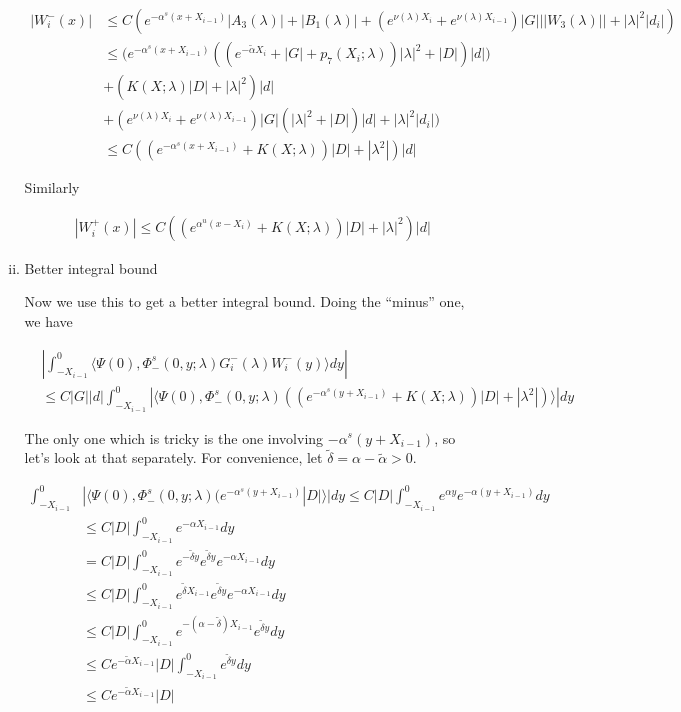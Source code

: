\documentclass[12pt]{article}
\begin{document}
\begin{enumerate}
\begin{enumerate}[(i)]
\begin{align*}
| W_i^-(x)| &\leq C \left( e^{-\alpha^s(x + X_{i-1})} |A_3(\lambda)| + |B_1(\lambda)| + (e^{\nu(\lambda)X_i} + e^{\nu(\lambda)X_{i-1}} )|G| ||W_3(\lambda)|| + |\lambda|^2 |d_i|  \right) \\
&\leq \Big( e^{-\alpha^s(x + X_{i-1})}( (e^{-\tilde{\alpha} X_i} + |G| + p_7(X_i; \lambda) ) |\lambda|^2  + |D|)|d|) \\
&+ ( K(X; \lambda) |D|+ |\lambda|^2 )|d| \\
&+ (e^{\nu(\lambda)X_i} + e^{\nu(\lambda)X_{i-1}} )|G| ( |\lambda|^2 + |D|)|d| + |\lambda|^2 |d_i| \Big) \\
&\leq C( (e^{-\alpha^s(x + X_{i-1})} + K(X; \lambda))|D| + |\lambda^2|)|d|
\end{align*}

Similarly

\begin{align*}
| W_i^+(x)| \leq C ( (e^{\alpha^u(x - X_i)} + K(X; \lambda))|D| + |\lambda|^2 )|d|
\end{align*}

\item Better integral bound

Now we use this to get a better integral bound. Doing the ``minus'' one, we have

\begin{align*}
&\left| \int_{-X_{i-1}}^0 \langle \Psi(0), \Phi^s_-(0, y; \lambda) G_i^-(\lambda)W_i^-(y) \rangle dy \right| \\
&\leq C |G| |d| \int_{-X_{i-1}}^0 | \langle \Psi(0), \Phi^s_-(0, y; \lambda) ( (e^{-\alpha^s(y + X_{i-1})} + K(X; \lambda))|D| + |\lambda^2|) \rangle | dy
\end{align*}

The only one which is tricky is the one involving ${-\alpha^s(y + X_{i-1})}$, so let's look at that separately. For convenience, let $\tilde{\delta} = \alpha - \tilde{\alpha} > 0$.

\begin{align*}
\int_{-X_{i-1}}^0 &| \langle \Psi(0), \Phi^s_-(0, y; \lambda) (e^{-\alpha^s(y + X_{i-1})} |D| \rangle | dy \leq C |D| \int_{-X_{i-1}}^0 e^{\alpha y} e^{-\alpha(y + X_{i-1})} dy \\
&\leq C |D| \int_{-X_{i-1}}^0 e^{-\alpha X_{i-1}} dy \\
&= C |D| \int_{-X_{i-1}}^0 e^{-\tilde{\delta} y} e^{\tilde{\delta} y}  e^{-\alpha X_{i-1}} dy \\
&\leq C |D| \int_{-X_{i-1}}^0 e^{\tilde{\delta} X_{i-1}} e^{\tilde{\delta} y}  e^{-\alpha X_{i-1}} dy \\
&\leq C |D| \int_{-X_{i-1}}^0 e^{-(\alpha - \tilde{\delta}) X_{i-1}} e^{\tilde{\delta} y} dy \\
&\leq C e^{-\tilde{\alpha} X_{i-1}} |D| \int_{-X_{i-1}}^0 e^{\tilde{\delta} y} dy \\
&\leq C e^{-\tilde{\alpha} X_{i-1}} |D|
\end{align*}


\end{enumerate}
\end{enumerate}
\end{document}

